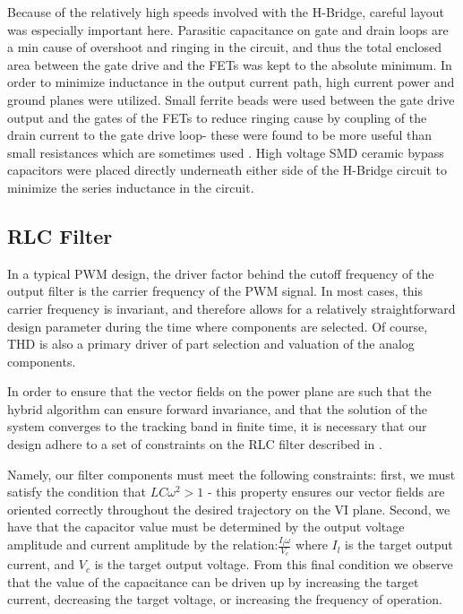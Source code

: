 Because of the relatively high speeds involved with the H-Bridge, careful layout was especially important here. Parasitic capacitance on gate and drain loops are a min cause of overshoot and ringing in the circuit, and thus the total enclosed area between the gate drive and the FETs was kept to the absolute minimum. In order to minimize inductance in the output current path, high current power and ground planes were utilized. Small ferrite beads were used between the gate drive output and the gates of the FETs to reduce ringing cause by coupling of the drain current to the gate drive loop- these were found to be more useful than small resistances which are sometimes used \cite{transphorm}. High voltage SMD ceramic bypass capacitors were placed directly underneath either side of the H-Bridge circuit to minimize the series inductance in the circuit. 
  
\subsection{RLC Filter}
In a typical PWM design, the driver factor behind the cutoff frequency of the output filter is the carrier frequency of the PWM signal. In most cases, this carrier frequency is invariant, and therefore allows for a relatively straightforward design parameter during the time where components are selected. Of course, THD is also a primary driver of part selection and valuation of the analog components.


In order to ensure that the vector fields on the power plane are such that the hybrid algorithm can ensure forward invariance, and that the solution of the system converges to the tracking band in finite time,  it is necessary that our design adhere to a set of constraints on the RLC filter described in \cite{ricardo}. 

Namely, our filter components must meet the following constraints: first, we must satisfy the condition that $LC\omega^2>1$ - this property ensures our vector fields are oriented correctly throughout the desired trajectory on the VI plane. Second, we have that the capacitor value must be determined by the output voltage amplitude and current amplitude by the relation:$\frac{I_l\omega}{V_c}$ where $I_l$ is the target output current, and $V_c$ is the target output voltage. From this final condition we observe that the value of the capacitance can be driven up by increasing the target current, decreasing the target voltage, or increasing the frequency of operation. 

